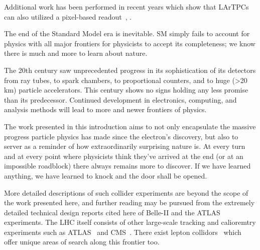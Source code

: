 Additional work has been performed in recent years which show that LArTPCs can also utilized a pixel-based readout~\citep{larpix:Dwyer_2018}, \citep{Asaadi_2018}.

The end of the Standard Model era is inevitable.
SM simply fails to account for physics with all major frontiers for physicists to accept its completeness; we know there is much and more to learn about nature.

The 20th century saw unprecedented progress in its sophistication of its detectors from ray tubes, to spark chambers, to proportional counters, and to huge (>20 km) particle accelerators.
This century shows no signs holding any less promise than its predecessor.
Continued development in electronics, computing, and analysis methods will lead to more and newer frontiers of physics.

The work presented in this introduction aims to not only encapsulate the massive progress particle physics has made since the electron's discovery, but also to server as a reminder of how extraordinarily surprising nature is.
At every turn and at every point where physicists think they've arrived at the end (or at an impossible roadblock) there always remains more to discover.
If we have learned anything, we have learned to knock and the door shall be opened.



More detailed descriptions of such collider experiments are beyond the scope of the work presented here, and further reading may be pursued from the extremely detailed technical design reports cited here of Belle-II and the ATLAS experiments.
The LHC itself consists of other large-scale tracking and calioremtry experiments such as ATLAS~\citep{ATLAS:1999vwa} and CMS~\citep{CMS:2006myw}.
There exist lepton collidors~\citep{belle2_tdr_arxiv} which offer unique areas of search along this frontier too.